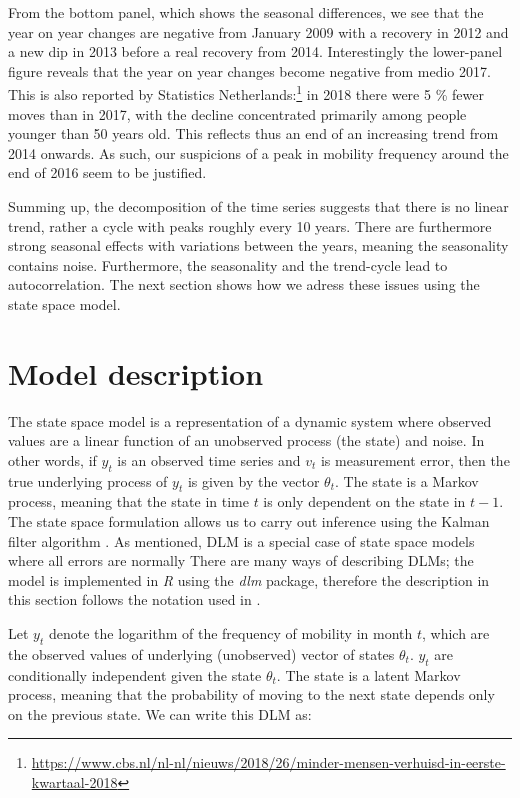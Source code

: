 \documentclass[12pt, a4paper]{article}
\begin{document}
From the bottom panel, which shows the seasonal differences, we see that
the year on year changes are negative from January 2009 with a recovery
in 2012 and a new dip in 2013 before a real recovery from 2014.
Interestingly the lower-panel figure reveals that the year on year
changes become negative from medio 2017. This is also reported by
Statistics
Netherlands:\footnote{\url{https://www.cbs.nl/nl-nl/nieuws/2018/26/minder-mensen-verhuisd-in-eerste-kwartaal-2018}}
in 2018 there were 5 \% fewer moves than in 2017, with the decline
concentrated primarily among people younger than 50 years old. This
reflects thus an end of an increasing trend from 2014 onwards. As such,
our suspicions of a peak in mobility frequency around the end of
2016 seem to be justified.

Summing up, the decomposition of the time series suggests that there is
no linear trend, rather a cycle with peaks roughly every 10 years. There
are furthermore strong seasonal effects with variations between the
years, meaning the seasonality contains noise. Furthermore, the
seasonality and the trend-cycle lead to autocorrelation. The next
section shows how we adress these issues using the state space model.

\section{Model description}\label{model-description}

The state space model is a representation of a dynamic system where observed values are a linear function of an unobserved process (the state) and noise. In other words, if $y_{t}$ is an observed time series and $v_{t}$ is measurement error, then the true underlying process of $y_{t}$ is given by the vector $\theta_{t}$. The state is a Markov process, meaning that the state in time $t$ is only dependent on the state in $t-1$. The state space formulation allows us to carry out inference using the Kalman filter algorithm
\citep{kalman1960contributions}. As mentioned, DLM is a special case of state space models where all errors are normally There are many ways of describing DLMs; the model
is implemented in \emph{R} using the \emph{dlm} package, therefore the
description in this section follows the notation used in
\citet{petris2009dynamic}.

Let $y_{t}$ denote the logarithm of the frequency of mobility in month
$t$, which are the observed values of underlying
(unobserved) vector of states $\theta_{t}$. $y_{t}$ are
conditionally independent given the state $\theta_{t}$. The state
is a latent Markov process, meaning that the probability of
moving to the next state depends only on the previous state. We can
write this DLM as:
\end{document}
